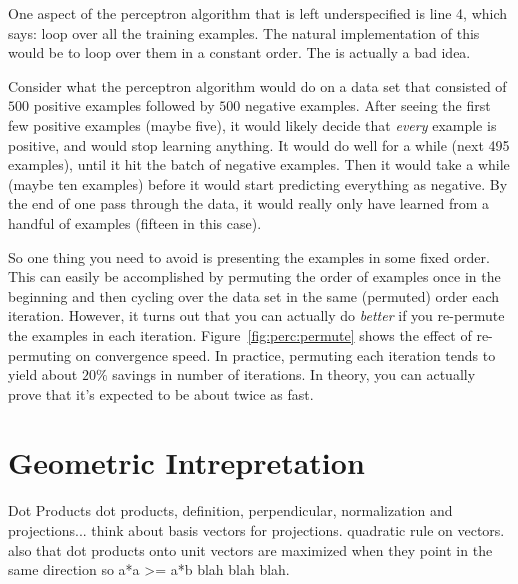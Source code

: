 One aspect of the perceptron algorithm that is left underspecified is
line 4, which says: loop over all the training examples.  The natural
implementation of this would be to loop over them in a constant
order.  The is actually a bad idea.

Consider what the perceptron algorithm would do on a data set that
consisted of $500$ positive examples followed by $500$ negative
examples.  After seeing the first few positive examples (maybe five),
it would likely decide that \emph{every} example is positive, and
would stop learning anything.  It would do well for a while (next 495
examples), until it hit the batch of negative examples.  Then it would
take a while (maybe ten examples) before it would start predicting
everything as negative.  By the end of one pass through the data, it
would really only have learned from a handful of examples (fifteen in
this case).



So one thing you need to avoid is presenting the examples in some
fixed order.  This can easily be accomplished by permuting the order
of examples once in the beginning and then cycling over the data set
in the same (permuted) order each iteration.  However, it turns out
that you can actually do \emph{better} if you re-permute the examples
in each iteration.  Figure~\ref{fig:perc:permute} shows the effect of
re-permuting on convergence speed.  In practice, permuting each
iteration tends to yield about $20\%$ savings in number of iterations.
In theory, you can actually prove that it's expected to be about twice
as fast.


\section{Geometric Intrepretation}

\begin{mathreview}{Dot Products}
  dot products, definition, perpendicular, normalization and
  projections... think about basis vectors for projections.  quadratic
  rule on vectors.  also that dot products onto unit vectors are
  maximized when they point in the same direction so a*a >= a*b blah
  blah blah.
\end{mathreview}

